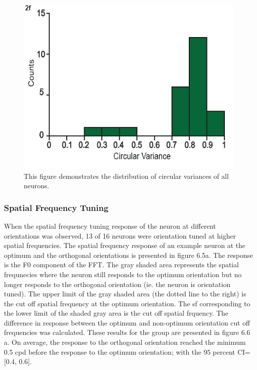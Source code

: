 	\begin{figure}
		\includegraphics[width=\linewidth]{SCCircVar.jpg}
		\caption{This figure demonstrates the distribution of circular
			variances of all neurons.}
		\label{fig:fig4}			
	\end{figure}
	
	
	
	\subsubsection{Spatial Frequency Tuning}
	When the spatial frequency tuning response of the neuron at different orientations was observed, 13 of 16 neurons were orientation tuned at higher spatial frequencies. The spatial frequency response of an example neuron at the optimum and the orthogonal orientations is presented in figure 6.5a. The response is the F0 component of the FFT. The gray shaded area represents the spatial frequnecies where the neuron still responds to the optimum orientation but no longer responds to the orthogonal orientation (ie. the neuron is orientation tuned).  The upper limit of the gray shaded area (the dotted line to the right) is the cut off spatial frequency at the optimum orientation. The sf corresponding to the lower limit of the shaded gray area is the cut off spatial frquency. The difference in response between the optimum and non-optimum orientation cut off frequencies was calculated. These results for the group are presented in figure 6.6 a. On average, the response to the orthogonal orientation reached the minimum 0.5 cpd before the response to the optimum orientation; with the 95 percent CI= [0.4, 0.6].
	
